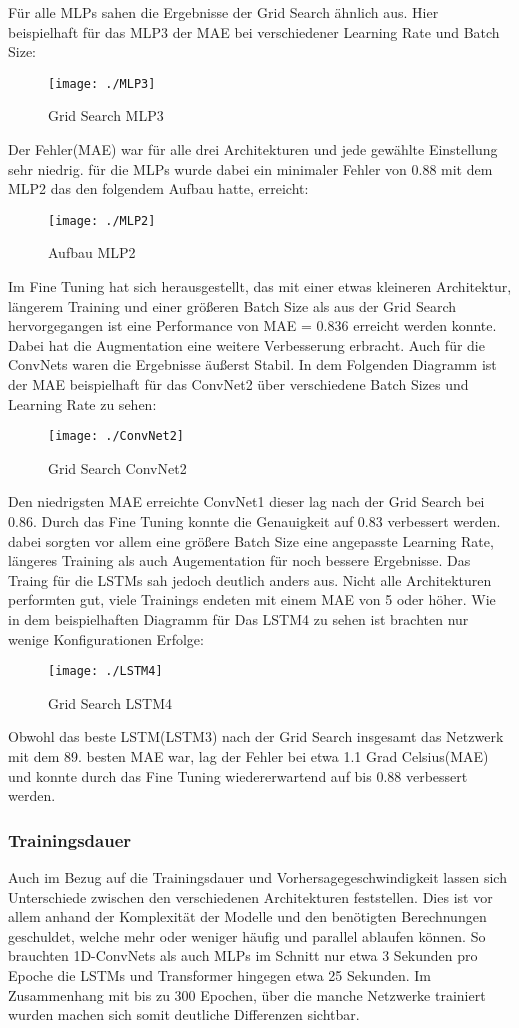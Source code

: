 \documentclass[acmtog, authorversion]{acmart} %
\begin{document}
Für alle MLPs sahen die Ergebnisse der Grid Search ähnlich aus. Hier beispielhaft für das MLP3 der MAE bei verschiedener Learning Rate und Batch Size:
\begin{figure}[H]
    \flushleft
    \texttt{[image: ./MLP3]}
    \label{fig:sub4}
    \caption{Grid Search MLP3}
\end{figure}
Der Fehler(MAE) war für alle drei Architekturen und jede gewählte Einstellung sehr niedrig. für die MLPs wurde dabei ein minimaler Fehler von 0.88 mit dem MLP2 das den folgendem Aufbau hatte, erreicht: 
\begin{figure}[H]
    \centering
    \texttt{[image: ./MLP2]}
    \label{fig:sub5}
    \caption{Aufbau MLP2}
\end{figure}
Im Fine Tuning hat sich herausgestellt, das mit einer etwas kleineren Architektur, längerem Training und einer größeren Batch Size als aus der Grid Search hervorgegangen ist eine Performance von MAE = 0.836 erreicht werden konnte. Dabei hat die Augmentation eine weitere Verbesserung erbracht.
Auch für die ConvNets waren die Ergebnisse äußerst Stabil. In dem Folgenden Diagramm ist der MAE beispielhaft für das ConvNet2 über verschiedene Batch Sizes und Learning Rate zu sehen:
\begin{figure}[H]
    \centering
    \texttt{[image: ./ConvNet2]}
    \label{fig:sub6}
    \caption{Grid Search ConvNet2}
\end{figure}
Den niedrigsten MAE erreichte ConvNet1 dieser lag nach der Grid Search bei 0.86. Durch das Fine Tuning konnte die Genauigkeit auf 0.83 verbessert werden. dabei sorgten vor allem eine größere Batch Size eine angepasste Learning Rate, längeres Training als auch Augementation für noch bessere Ergebnisse.
Das Traing für die LSTMs sah jedoch deutlich anders aus. Nicht alle Architekturen performten gut, viele Trainings endeten mit einem MAE von 5 oder höher. Wie in dem beispielhaften Diagramm für Das LSTM4 zu sehen ist brachten nur wenige Konfigurationen Erfolge:
\begin{figure}[H]
    \centering
    \texttt{[image: ./LSTM4]}
    \label{fig:sub7}
    \caption{Grid Search LSTM4}
\end{figure}
Obwohl das beste LSTM(LSTM3) nach der Grid Search insgesamt das Netzwerk mit dem 89. besten MAE war, lag der Fehler bei etwa 1.1 Grad Celsius(MAE) und konnte durch das Fine Tuning wiedererwartend auf bis 0.88 verbessert werden.

\subsubsection{Trainingsdauer}
Auch im Bezug auf die Trainingsdauer und Vorhersagegeschwindigkeit lassen sich Unterschiede zwischen den verschiedenen Architekturen feststellen. 
Dies ist vor allem anhand der Komplexität der Modelle und den benötigten Berechnungen geschuldet, welche mehr oder weniger häufig und parallel ablaufen können.
So brauchten 1D-ConvNets als auch MLPs im Schnitt nur etwa 3 Sekunden pro Epoche die LSTMs und Transformer hingegen etwa 25 Sekunden.
Im Zusammenhang mit bis zu 300 Epochen, über die manche Netzwerke trainiert wurden machen sich somit deutliche Differenzen sichtbar.
\end{document}

